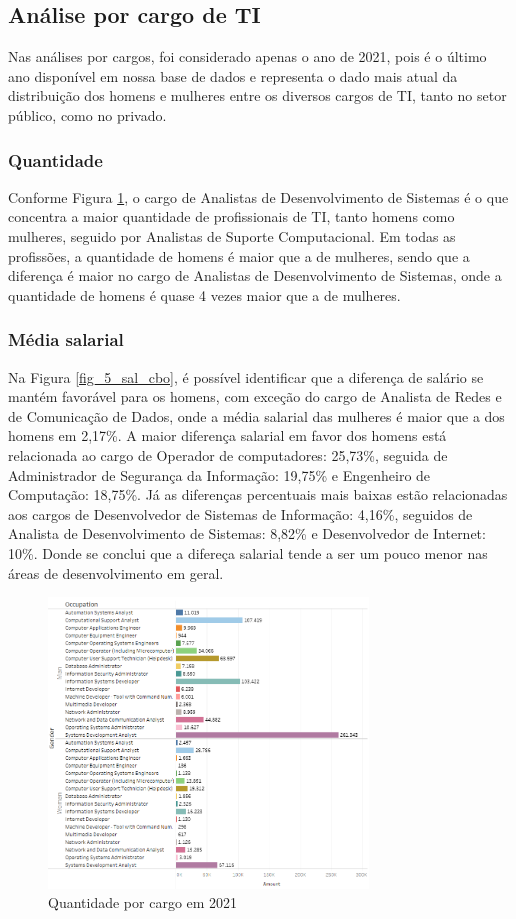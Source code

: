 \subsection{Análise por cargo de TI}

Nas análises por cargos, foi considerado apenas o ano de 2021, pois é o último ano disponível em nossa base de dados e representa o dado mais atual da distribuição dos homens e mulheres entre os diversos cargos de TI, tanto no setor público, como no privado.

\subsubsection{Quantidade}

Conforme Figura \ref{fig_5_qnt_cbo}, o cargo de Analistas de Desenvolvimento de Sistemas é o que concentra a maior quantidade de profissionais de TI, tanto homens como mulheres, seguido por Analistas de Suporte Computacional. Em todas as profissões, a quantidade de homens é maior que a de mulheres, sendo que a diferença é maior no cargo de Analistas de Desenvolvimento de Sistemas, onde a quantidade de homens é quase 4 vezes maior que a de mulheres.

\subsubsection{Média salarial}

Na Figura \ref{fig_5_sal_cbo}, é possível identificar que a diferença de salário se mantém favorável para os homens, com exceção do cargo de Analista de Redes e de Comunicação de Dados, onde a média salarial das mulheres é maior que a dos homens em 2,17\%. A maior diferença salarial em favor dos homens está relacionada ao cargo de Operador de computadores: 25,73\%, seguida de Administrador de Segurança da Informação: 19,75\% e Engenheiro de Computação: 18,75\%. Já as diferenças percentuais mais baixas estão relacionadas aos cargos de Desenvolvedor de Sistemas de Informação: 4,16\%, seguidos de Analista de Desenvolvimento de Sistemas: 8,82\% e Desenvolvedor de Internet: 10\%. Donde se conclui que a difereça salarial tende a ser um pouco menor nas áreas de desenvolvimento em geral.


\begin{figure}[htbp]
	\centerline{
		\includegraphics[width=85mm]{assets/5_qnt_cbo.PNG}
	}
	\caption{Quantidade por cargo em 2021}
	\label{fig_5_qnt_cbo}
\end{figure}

